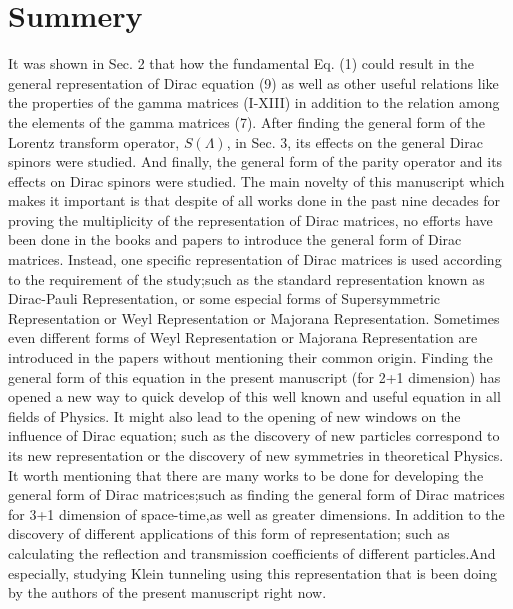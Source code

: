\documentclass[twocolumn,aps,prb,showpacs]{revtex4-1}
\begin{document}
\section{Summery}
\label{sec:4}
It was shown in Sec. 2 that how the fundamental Eq. (1) could result in the general representation of Dirac equation (9) as well as other useful relations like the properties of the gamma matrices (I-XIII) in addition to the relation among the elements of the gamma matrices (7). After finding the general form of the Lorentz transform operator, $S(\Lambda)$, in Sec. 3, its effects on the general Dirac spinors were studied. And finally, the general form of the parity operator and its effects on Dirac spinors were studied. The main novelty of this manuscript which makes it important is that despite of all works done in the past nine decades for proving the multiplicity of the representation of Dirac matrices, no efforts have been done in the books and papers to introduce the general form of Dirac matrices. Instead, one specific representation of Dirac matrices is used according to the requirement of the study;such as the standard representation known as Dirac-Pauli Representation, or some especial forms of Supersymmetric Representation or Weyl Representation or Majorana Representation. Sometimes even different forms of Weyl Representation or Majorana Representation are introduced in the papers without mentioning their common origin. Finding the general form of this equation in the present manuscript (for 2+1 dimension) has opened a new way to quick develop of this well known and useful equation in all fields of Physics. It might also lead to the opening of new windows on the influence of Dirac equation; such as the discovery of new particles correspond to its new representation or the discovery of new symmetries in theoretical Physics.
It worth mentioning that there are many works to be done for developing the general form of Dirac matrices;such as finding the general form of Dirac matrices for 3+1 dimension of space-time,as well as greater dimensions. In addition to the discovery of different applications of this form of representation; such as calculating the reflection and transmission coefficients of different particles.And especially, studying Klein tunneling using this representation that is been doing by the authors of the present manuscript right now.





\end{document}
